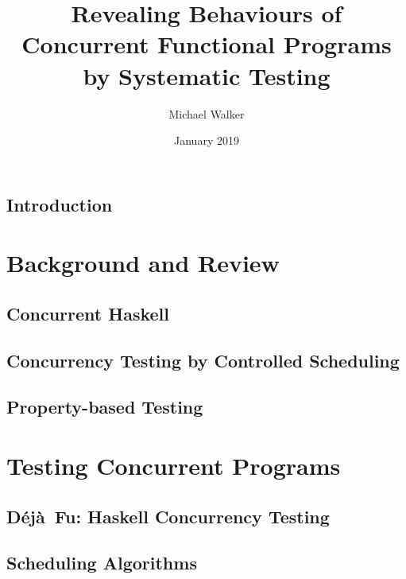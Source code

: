 \documentclass[openright,imperial,11pt]{octavo}
\title{Revealing Behaviours of Concurrent Functional Programs by Systematic Testing}
\author{Michael Walker}
\date{January 2019}
\newcommand{\dejafu}{D\'{e}j\`{a}~Fu}
\begin{document}
\pagestyle{plain}

\makeatletter\@openrightfalse\makeatother



\cleardoublepage

\makeatletter\@openrighttrue\makeatother

\pagestyle{headings}

\chapter{Introduction}
\label{chp:introduction}


\part{Background and Review}
\label{part:review}

\chapter{Concurrent Haskell}
\label{chp:concurrent_haskell}


\chapter{Concurrency Testing by Controlled Scheduling}
\label{chp:sct}


\chapter{Property-based Testing}
\label{chp:property_testing}


\part{Testing Concurrent Programs}
\label{part:testing}

\chapter{\dejafu{}: Haskell Concurrency Testing}
\label{chp:dejafu}


\chapter{Scheduling Algorithms}
\label{chp:algorithms}

\end{document}
